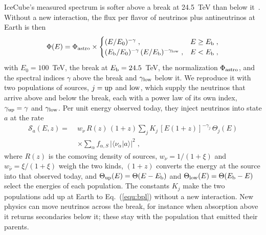 \documentclass[linenumbers, aps, prd, twocolumn, superscriptaddress, floatfix, longbibliography, nofootinbib, bibnotes]{revtex4-2}
\begin{document}
IceCube's measured spectrum is softer above a break at 24.5~TeV than below it~\cite{IceCube:2025ewu}.
Without a new interaction, the flux per flavor of neutrinos plus antineutrinos at Earth is then
\begin{equation}
 \label{equ:bpl}
 \Phi(E) = \Phi_{\rm astro} \times
 \begin{cases}
 (E/E_0)^{-\gamma} \;, & E \geq E_{\rm b} \;, \\
 (E_{\rm b}/E_0)^{-\gamma}\, (E/E_{\rm b})^{-\gamma_{\rm low}} \;, & E < E_{\rm b} \;,
 \end{cases}
\end{equation}
with $E_0 = 100$~TeV, the break at $E_{\rm b} = 24.5$~TeV, the normalization $\Phi_{\rm astro}$, and the spectral indices $\gamma$ above the break and $\gamma_{\rm low}$ below it.
We reproduce it with two populations of sources, $j = {\rm up}$ and ${\rm low}$, which supply the neutrinos that arrive above and below the break, each with a power law of its own index, $\gamma_{\rm up} = \gamma$ and $\gamma_{\rm low}$.
Per unit energy observed today, they inject neutrinos into state $a$ at the rate
\begin{equation}
 \label{equ:source}
 \begin{split}
 \mathcal{S}_a(E, z) = \; & w_\nu\, R(z)\, (1+z) \sum_j K_j\, [E(1+z)]^{-\gamma_j}\, \Theta_j(E) \\
 & \times \sum_\alpha f_{\alpha,S}\, |\langle\nu_\alpha|a\rangle|^2 \;,
 \end{split}
\end{equation}
where $R(z)$ is the comoving density of sources, $w_\nu = 1/(1+\xi)$ and $w_{\bar\nu} = \xi/(1+\xi)$ weigh the two kinds, $(1+z)$ converts the energy at the source into that observed today, and $\Theta_{\rm up}(E) = \Theta(E - E_{\rm b})$ and $\Theta_{\rm low}(E) = \Theta(E_{\rm b} - E)$ select the energies of each population.
The constants $K_j$ make the two populations add up at Earth to Eq.~(\ref{equ:bpl}) without a new interaction.
New physics can move neutrinos across the break, for instance when absorption above it returns secondaries below it; these stay with the population that emitted their parents.
\end{document}
